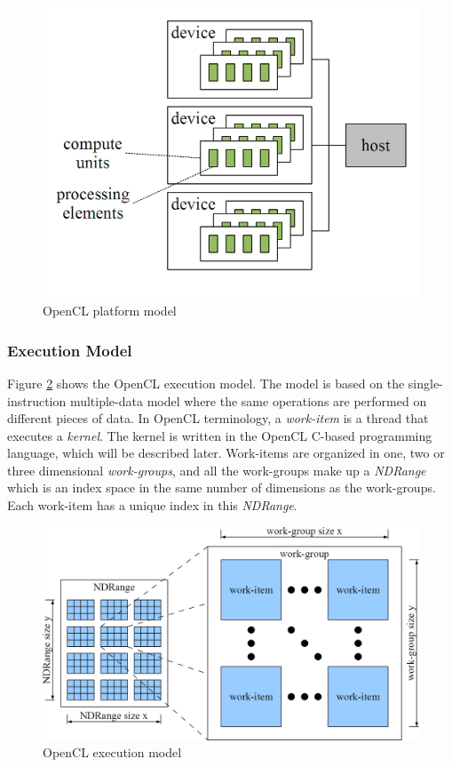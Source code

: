 		\begin{figure}[h]
		\centering
		\includegraphics[height=0.35\textheight]{graphics/platform_model.png}
		\caption{OpenCL platform model}
		\label{fig:opencl_platform}
		\end{figure}
	
	\subsubsection{Execution Model}
		
		Figure \ref{fig:opencl_execution} shows the OpenCL execution model. The model is based on the single-instruction multiple-data model where the same operations are performed on different pieces of data. In OpenCL terminology, a \emph{work-item} is a thread that executes a \emph{kernel}. The kernel is written in the OpenCL C-based programming language, which will be described later. Work-items are organized in one, two or three dimensional \emph{work-groups}, and all the work-groups make up a \emph{NDRange} which is an index space in the same number of dimensions as the work-groups. Each work-item has a unique index in this \textit{NDRange}.
		
		\begin{figure}[h]
		\centering
		\includegraphics[width=1\textwidth]{graphics/execution_model.png}
		\caption{OpenCL execution model}
		\label{fig:opencl_execution}
		\end{figure}
		
